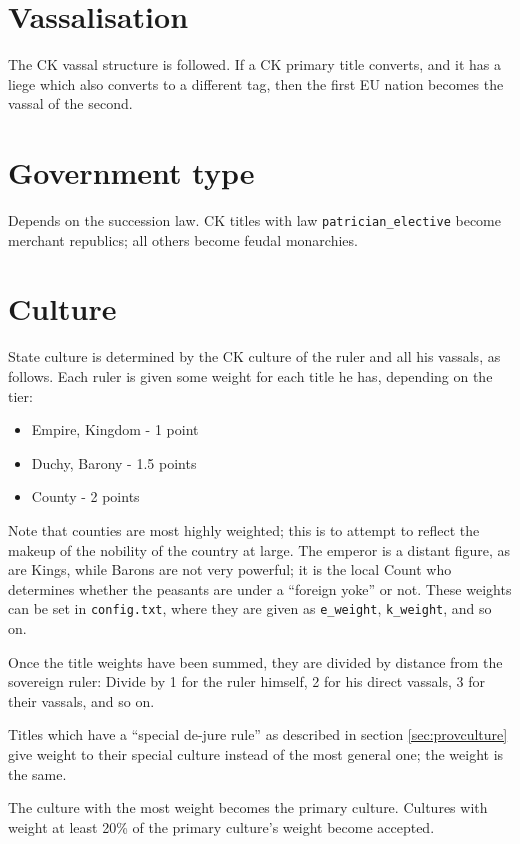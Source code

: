 \documentclass[12pt,ebook,oneside]{book}
\begin{document}
\section{Vassalisation}

The CK vassal structure is followed. If a CK primary title converts,
and it has a liege which also converts to a different tag, then the first EU nation
becomes the vassal of the second. 

\section{Government type}

Depends on the succession law. CK titles with law
\verb|patrician_elective| become merchant republics; all others
become feudal monarchies.

\section{Culture}

State culture is determined by the CK culture of the ruler and all his
vassals, as follows. Each ruler is given some weight for each title he
has, depending on the tier:
\begin{itemize}
\item Empire, Kingdom - 1 point
\item Duchy, Barony - 1.5 points
\item County - 2 points
\end{itemize}
Note that counties are most highly weighted; this is to attempt to
reflect the makeup of the nobility of the country at large. The
emperor is a distant figure, as are Kings, while Barons are not very
powerful; it is the local Count who
determines whether the peasants are under a ``foreign yoke'' or not.
These weights can be set in \verb|config.txt|, where they are given 
as \verb|e_weight|, \verb|k_weight|, and so on. 

Once the title weights have been summed, they are divided by distance
from the sovereign ruler: Divide by 1 for the ruler himself, 2 for his
direct vassals, 3 for their vassals, and so on. 

Titles which have a ``special de-jure rule'' as described in section
\ref{sec:provculture} give weight to their special culture instead of
the most general one; the weight is the same. 

The culture with the most weight becomes the primary culture. 
Cultures with weight at least 20\% of the primary culture's weight
become accepted. 
\end{document}
